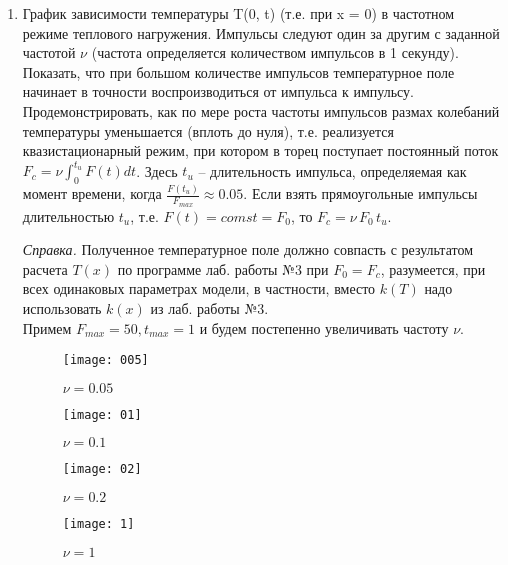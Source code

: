 \documentclass[a4paper, 14pt]{article}
\begin{document}
\begin{enumerate}
\newpage
\item График зависимости температуры  T(0, t) (т.е. при x = 0) в частотном режиме теплового нагружения. Импульсы следуют один за другим с заданной частотой $\nu$ (частота определяется количеством импульсов в 1 секунду). \\Показать, что при большом количестве импульсов температурное поле начинает в точности воспроизводиться от импульса к импульсу.  \\Продемонстрировать, как по мере роста частоты импульсов размах колебаний температуры уменьшается (вплоть до нуля), т.е. реализуется квазистационарный режим, при котором в торец поступает постоянный поток $F_c = \nu \int^{t_{u}}_0 F(t)dt$. Здесь $t_u$ -- длительность импульса, определяемая как момент времени, когда $\frac{F(t_u)}{F_{max}} \approx 0.05$. Если взять прямоугольные импульсы длительностью $t_u$, т.е. $F(t)=comst=F_0$, то $F_c = \nu \, F_0 \, t_u$.

\textit{Справка.} Полученное температурное поле должно совпасть с результатом расчета $T(x)$  по программе лаб. работы №3 при $F_0=F_c$, разумеется, при всех одинаковых параметрах модели, в частности, вместо $k(T)$ надо использовать $k(x)$  из лаб. работы №3. \\

Примем $F_{max}=50, t_{max}=1$ и будем постепенно увеличивать частоту $\nu$.

\begin{figure}[H]
        	\begin{center}
        		\texttt{[image: 005]}
        		\caption{$\nu=0.05$}
        		\label{a2b2}
        	\end{center}
\end{figure}

\begin{figure}[H]
        	\begin{center}
        		\texttt{[image: 01]}
        		\caption{$\nu=0.1$}
        		\label{a2b2}
        	\end{center}
\end{figure}

\begin{figure}[H]
        	\begin{center}
        		\texttt{[image: 02]}
        		\caption{$\nu=0.2$}
        		\label{a2b2}
        	\end{center}
\end{figure}

\begin{figure}[H]
        	\begin{center}
        		\texttt{[image: 1]}
        		\caption{$\nu=1$}
        		\label{a2b2}
        	\end{center}
\end{figure}


\end{enumerate}
\end{document}
